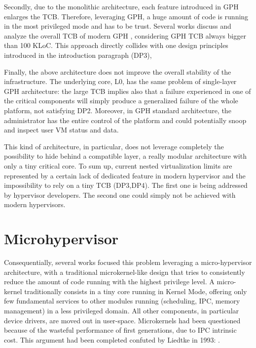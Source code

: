 \documentclass{sig-alternate}
\begin{document}
Secondly, due to the monolithic architecture, each feature introduced in GPH enlarges the TCB. Therefore, leveraging GPH, a huge amount of code is running in the most privileged mode and has to be trust. Several works discuss and analyze the overall TCB of modern GPH \cite{nova, xmhf}, considering GPH TCB always bigger than 100 KLoC. This approach directly collides with one design principles introduced in the introduction paragraph (DP3), 

Finally, the above architecture does not improve the overall stability of the infrastructure. The underlying core, L0, has the same problem of single-layer GPH architecture: the large TCB implies also that a failure experienced in one of the critical components will simply produce a generalized failure of the whole platform, not satisfying DP2. Moreover, in GPH standard architecture, the administrator has the entire control of the platform and could potentially snoop and inspect user VM status and data.

This kind of architecture, in particular, does not leverage completely the possibility to hide behind a compatible layer, a really modular architecture with only a tiny critical core.
To sum up, current nested virtualization limits are represented by a certain lack of dedicated feature in modern hypervisor and the impossibility to rely on a tiny TCB (DP3,DP4).
The first one is being addressed by hypervisor developers. The second one could simply not be achieved with modern hypervisors. 

\section{Microhypervisor}
\label{sec:mh}


Consequentially, several works focused this problem leveraging a micro-hypervisor architecture, with a traditional microkernel-like design that tries to consistently reduce the amount of code running with the highest privilege level. A micro-kernel traditionally consists in a tiny core running in Kernel Mode, offering only few fundamental services to other modules running (scheduling, IPC, memory management) in a less privileged domain. All other components, in particular device drivers, are moved out in user-space.
Microkernels had been questioned because of the wasteful performance of first generations, due to IPC intrinsic cost. This argument had been completed confuted by Liedtke in 1993: \cite{liedtke1993ImpIPCbyKerDes,liedtke1995micCon}.
\end{document}
